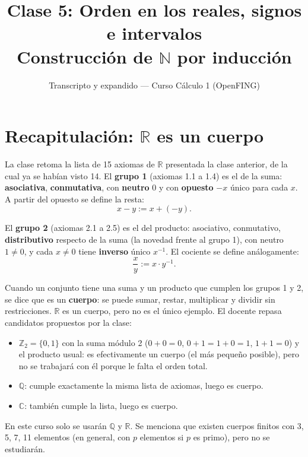 \documentclass[12pt,a4paper]{article}
\title{\textbf{Clase 5: Orden en los reales, signos e intervalos} \\[0.3em]
        \large{Construcción de $\mathbb{N}$ por inducción}}
\author{Transcripto y expandido --- Curso Cálculo 1 (OpenFING)}
\date{}
\begin{document}
\maketitle
\thispagestyle{empty}
\newpage

\tableofcontents
\newpage

\section{Recapitulación: $\mathbb{R}$ es un cuerpo}

La clase retoma la lista de 15 axiomas de $\mathbb{R}$ presentada la clase
anterior, de la cual ya se habían visto 14. El \textbf{grupo 1} (axiomas 1.1
a 1.4) es el de la suma: \textbf{asociativa}, \textbf{conmutativa}, con
\textbf{neutro} $0$ y con \textbf{opuesto} $-x$ único para cada $x$. A partir
del opuesto se define la resta:
$$x - y := x + (-y).$$

El \textbf{grupo 2} (axiomas 2.1 a 2.5) es el del producto: asociativo,
conmutativo, \textbf{distributivo} respecto de la suma (la novedad frente al
grupo 1), con neutro $1 \neq 0$, y cada $x \neq 0$ tiene \textbf{inverso}
único $x^{-1}$. El cociente se define análogamente:
$$\frac{x}{y} := x \cdot y^{-1}.$$

Cuando un conjunto tiene una suma y un producto que cumplen los grupos 1 y 2,
se dice que es un \textbf{cuerpo}: se puede sumar, restar, multiplicar y
dividir sin restricciones. $\mathbb{R}$ es un cuerpo, pero no es el único
ejemplo. El docente repasa candidatos propuestos por la clase:

\begin{itemize}
  \item $\mathbb{Z}_2 = \{0,1\}$ con la suma módulo 2 ($0+0=0$, $0+1=1+0=1$,
    $1+1=0$) y el producto usual: es efectivamente un cuerpo (el más pequeño
    posible), pero no se trabajará con él porque le falta el orden total.
  \item $\mathbb{Q}$: cumple exactamente la misma lista de axiomas, luego es
    cuerpo.
  \item $\mathbb{C}$: también cumple la lista, luego es cuerpo.
\end{itemize}

\begin{notebox}
En este curso solo se usarán $\mathbb{Q}$ y $\mathbb{R}$. Se menciona que
existen cuerpos finitos con 3, 5, 7, 11 elementos (en general, con $p$
elementos si $p$ es primo), pero no se estudiarán.
\end{notebox}
\end{document}
